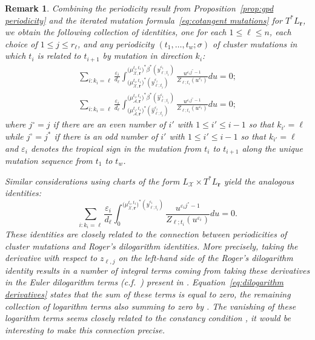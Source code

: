 \documentclass{amsart}
\newtheorem{remark}[theorem]{Remark}
\numberwithin{equation}{section}
\newcommand{\bfr}{{\boldsymbol{r}}}
\newcommand{\cA}{\mathcal{A}}
\newcommand{\cX}{\mathcal{X}}
\begin{document}
\begin{remark}
  Combining the periodicity result from Proposition~\ref{prop:gpd periodicity} and the iterated mutation formula~\eqref{eq:cotangent mutations} for $T^* L_\bfr$, we obtain the following collection of identities, one for each $1\le\ell\le n$, each choice of $1\le j\le r_\ell$, and any periodicity $(t_1,\ldots,t_w;\sigma)$ of cluster mutations in which $t_i$ is related to $t_{i+1}$ by mutation in direction $k_i$:
  \begin{align}
    \sum_{i:k_i=\ell} \frac{\varepsilon_i}{d_\ell} \int_{\big(\mu_{\cX,\bfr}^{t_i,t_1}\big)^*(y_{\ell;t_i}^{\varepsilon_i})}^{\big(\mu_{\cX,\bfr}^{t_i,t_1}\big)^*\beta^*(y_{\ell;t_i}^{\varepsilon_i})} \frac{u^{\varepsilon_i j^\circ-1}}{Z_{\ell;t_i}(u^{\varepsilon_i})}du=0;\\
    \sum_{i:k_i=\ell} \frac{\varepsilon_i}{d_\ell} \int_{\big(\mu_{\cA,\bfr}^{t_i,t_1}\big)^*(\hat y_{\ell;t_i}^{\varepsilon_i})}^{\big(\mu_{\cA,\bfr}^{t_i,t_1}\big)^*\beta^*(\hat y_{\ell;t_i}^{\varepsilon_i})} \frac{u^{\varepsilon_i j^\circ-1}}{Z_{\ell;t_i}(u^{\varepsilon_i})}du=0;
  \end{align}
  where $j^\circ=j$ if there are an even number of $i'$ with $1\le i'\le i-1$ so that $k_{i'}=\ell$ while $j^\circ=j^*$ if there is an odd number of $i'$ with $1\le i'\le i-1$ so that $k_{i'}=\ell$ and $\varepsilon_i$ denotes the tropical sign in the mutation from $t_i$ to $t_{i+1}$ along the unique mutation sequence from $t_1$ to $t_w$.

  Similar considerations using charts of the form $L_\cX\times T^* L_\bfr$ yield the analogous identities:
  \begin{equation}
    \label{eq:dilogarithm derivatives}
    \sum_{i:k_i=\ell} \frac{\varepsilon_i}{d_\ell} \int_0^{\big(\mu_{\cX,\bfr}^{t_i,t_1}\big)^*(y_{\ell;t_i}^{\varepsilon_i})} \frac{u^{\varepsilon_i j^\circ-1}}{Z_{\ell;t_i}(u^{\varepsilon_i})}du=0.
  \end{equation}
  These identities are closely related to the connection between periodicities of cluster mutations and Roger's dilogarithm identities.
  More precisely, taking the derivative with respect to $z_{\ell,j}$ on the left-hand side of the Roger's dilogarithm identity \cite[Equation (4.28)]{Nak16} results in a number of integral terms coming from taking these derivatives in the Euler dilogarithm terms (c.f.\ \cite[Equation (3.5)]{Nak16}) present in \cite[Equation (4.28)]{Nak16}.
  Equation~\eqref{eq:dilogarithm derivatives} states that the sum of these terms is equal to zero, the remaining collection of logarithm terms also summing to zero by \cite[Equation (4.28)]{Nak16}.
  The vanishing of these logarithm terms seems closely related to the constancy condition \cite[Theorem 4.4]{Nak16}, it would be interesting to make this connection precise.
\end{remark}
\end{document}
